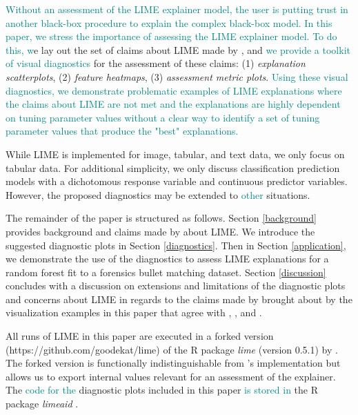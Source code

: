 \documentclass[AMS,STIX2COL]{WileyNJD-v2}\usepackage[]{graphicx}\usepackage[]{color}
\newcommand{\kge}[1]{\textcolor{teal}{#1}}
\renewcommand{\sout}[1]{\unskip}
\begin{document}
\sout{As a result of the various ways LIME can fail, it is important to assess LIME explanations. We suggest the use of visual diagnostics for assessment. In this paper,} \kge{Without an assessment of the LIME explainer model, the user is putting trust in another black-box procedure to explain the complex black-box model. In this paper, we stress the importance of assessing the LIME explainer model.} \kge{To do this, w}e lay out the set of claims about LIME made by \citet{ribeiro:2016}, and \kge{we provide a toolkit of visual diagnostics} \sout{propose three visualizations} for the assessment of these claims: (1) \emph{explanation scatterplots}, (2) \emph{feature heatmaps}, (3) \emph{assessment metric plots}. \kge{Using these visual diagnostics, we demonstrate problematic examples of LIME explanations where the claims about LIME are not met and the explanations are highly dependent on tuning parameter values without a clear way to identify a set of tuning parameter values that produce the "best" explanations.}

While LIME is implemented for image, tabular, and text data, we only focus on tabular data. For additional simplicity, we only discuss classification prediction models with a dichotomous response variable and continuous predictor variables. However, the proposed diagnostics may be extended to \kge{other} \sout{a wider range of} situations.

The remainder of the paper is structured as follows. Section \ref{background} provides background and claims made by \citet{ribeiro:2016} about LIME. We introduce the suggested diagnostic plots in Section \ref{diagnostics}. Then in Section \ref{application}, we demonstrate the use of the diagnostics to assess LIME explanations for a random forest  fit to a forensics bullet matching dataset. Section \ref{discussion} concludes with a discussion on extensions and limitations of the diagnostic plots and concerns about LIME in regards to the claims made by \citet{ribeiro:2016} brought about by the visualization examples in this paper that agree with \citet{alvarezmelis:2018}, \citet{laugel:2018}, and \citet{molnar:2019}.

All runs of LIME in this paper are executed in a forked version (https://github.com/goodekat/lime) of the R package \emph{lime} (version 0.5.1) by \citet{pedersen:2020}. The forked version is functionally indistinguishable from \citeauthor{pedersen:2020}'s implementation but allows us to export internal values relevant for an assessment of the explainer. The \kge{code for the} diagnostic plots included in this paper \kge{is stored in} \sout{are created using} the R package \emph{limeaid} \citep{goode:2020}.
\end{document}
